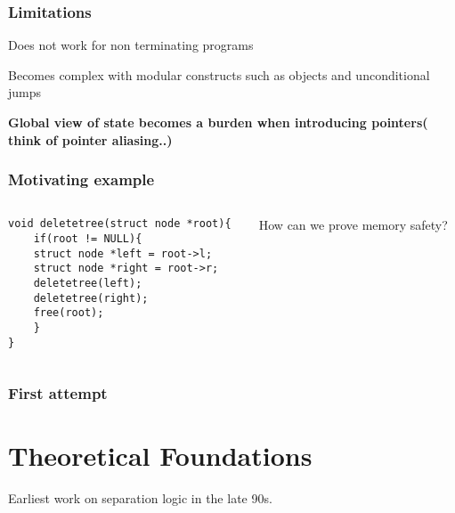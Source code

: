 \documentclass{beamer}
\begin{document}
    \begin{frame}
        \frametitle{Limitations}
        
        Does not work for non terminating programs 
        \pause    
        \bigskip
        
        Becomes complex with modular constructs such as objects and unconditional jumps
        \pause
        \bigskip

        \textbf{Global view of state becomes a burden when introducing pointers( think of pointer aliasing..)}

        
    \end{frame}
\begin{frame}[fragile]
    \frametitle{Motivating example}
        \begin{columns}
    \begin{column}{0.7\textwidth}
    \begin{lstlisting}
void deletetree(struct node *root){
    if(root != NULL){
    struct node *left = root->l;
    struct node *right = root->r;
    deletetree(left);
    deletetree(right);
    free(root);
    }
}
    \end{lstlisting}
        \end{column}
            \begin{column}{0.3\textwidth}
                How can we prove memory safety?
            \end{column}
        \end{columns}
    \end{frame}
    \begin{frame}
        \frametitle{First attempt}

        
    \end{frame}
    \section{Theoretical Foundations}
    Earliest work on separation logic in the late 90s.
\end{document}
